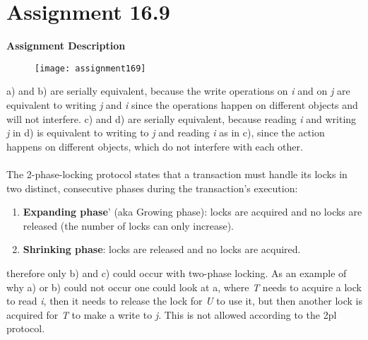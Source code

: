 \section{Assignment 16.9}
\textbf{Assignment Description}
\begin{figure}[H]
	\texttt{[image: assignment169]}
\end{figure}

a) and b) are serially equivalent, because the write operations on \textit{i} and on \textit{j} are equivalent to writing \textit{j} and \textit{i} since the operations happen on different objects and will not interfere. 
c) and d) are serially equivalent, because reading \textit{i} and writing \textit{j} in d) is equivalent to writing to \textit{j} and reading \textit{i} as in c), since the action happens on different objects, which do not interfere with each other.\\\\
The 2-phase-locking protocol states that a transaction must handle its locks in two distinct, consecutive phases during the transaction's execution:
\begin{enumerate}
	\item \textbf{Expanding phase}' (aka Growing phase): locks are acquired and no locks are released (the number of locks can only increase).
	\item \textbf{Shrinking phase}: locks are released and no locks are acquired.
\end{enumerate}
therefore only b) and c) could occur with two-phase locking. As an example of why a) or b) could not occur one could look at a, where \textit{T} needs to acquire a lock to read \textit{i}, then it needs to release the lock for \textit{U} to use it, but then another lock is acquired for \textit{T} to make a write to \textit{j}. This is not allowed according to the 2pl protocol.